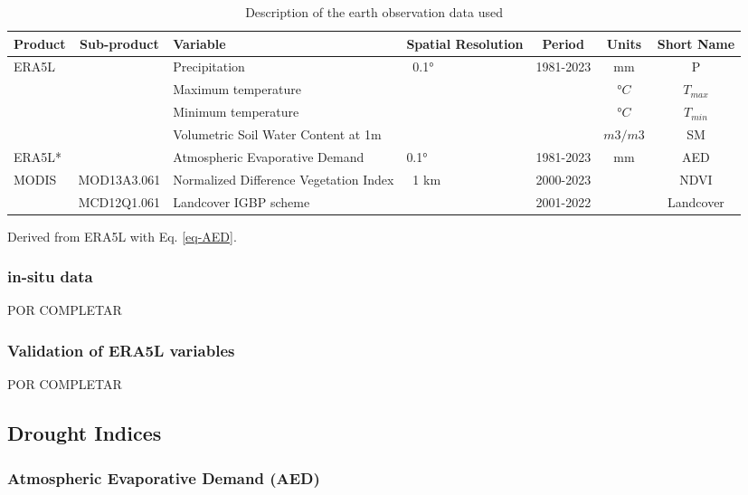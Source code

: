 \documentclass[
  authoryear,
  preprint,
  3p,
  onecolumn]{elsarticle}
\begin{document}
\begin{table}[!ht]
\caption{Description of the earth observation data used }
\label{tab-desEOD}
\small
\centering
\begin{tabular}{p{}cp{}p{}ccc}
\hline
\multirow{1}{*}{\centering Product} & Sub-product & Variable & Spatial Resolution  & Period & Units & Short Name \\ 
\hline
\multirow{4}{*}{ERA5L} & ~ & Precipitation & \multirow{4}{*}{~0.1°} & \multirow{4}{*}{1981-2023} & mm & P \\ 
         &  & Maximum temperature & ~ & & $°C$ & $T_{max}$ \\ 
         &  & Minimum temperature & ~ & & $°C$ & $T_{min}$ \\ 
         &  & Volumetric Soil Water Content at 1m & ~ & & $m3/m3$ & SM \\ 
ERA5L* & & Atmospheric Evaporative Demand & 0.1° & 1981-2023 & mm & AED \\
        \multirow{2}{*}{MODIS} & MOD13A3.061 & Normalized Difference Vegetation Index & \multirow{2}{*}{~1 km} & 2000-2023 & ~ & NDVI \\ 
         & MCD12Q1.061 & Landcover IGBP scheme & & 2001-2022 & ~ & Landcover \\ 
\hline
\end{tabular}
{\raggedright *Derived from ERA5L with Eq. \ref{eq-AED}. \par}
\end{table}

\hypertarget{in-situ-data}{%
\subsubsection{in-situ data}\label{in-situ-data}}

POR COMPLETAR

\hypertarget{validation-of-era5l-variables}{%
\subsubsection{Validation of ERA5L
variables}\label{validation-of-era5l-variables}}

POR COMPLETAR

\hypertarget{drought-indices}{%
\subsection{Drought Indices}\label{drought-indices}}

\hypertarget{atmospheric-evaporative-demand-aed}{%
\subsubsection{Atmospheric Evaporative Demand
(AED)}\label{atmospheric-evaporative-demand-aed}}
\end{document}

